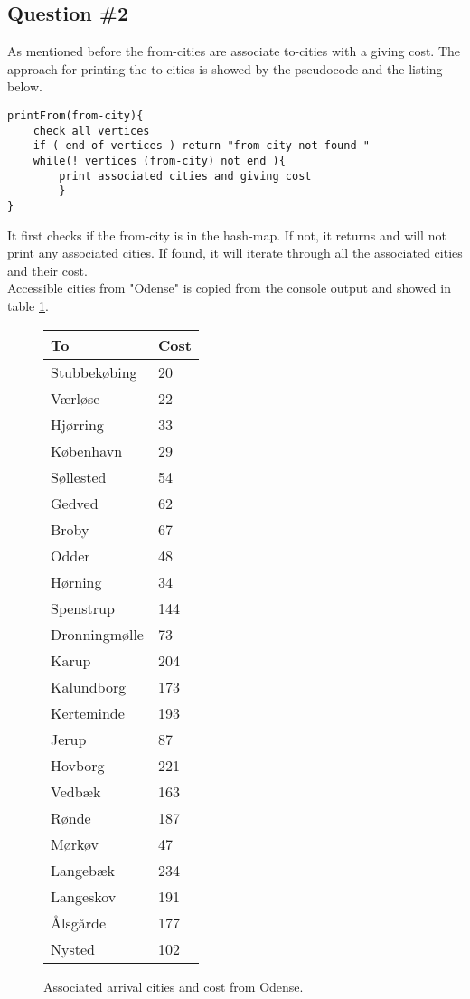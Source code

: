 \subsection{Question \#2}
As mentioned before the from-cities are associate to-cities with a giving cost. The approach for printing the to-cities is showed by the pseudocode and the listing below. 
\bigskip
\begin{lstlisting}
printFrom(from-city){
	check all vertices 
	if ( end of vertices ) return "from-city not found "
	while(! vertices (from-city) not end ){
	    print associated cities and giving cost
        }
}
\end{lstlisting}
\bigskip
It first checks if the from-city is in the hash-map. If not, it returns and will not print any associated cities. If found, it will iterate through all the associated cities and their cost.\\
Accessible cities from "Odense" is copied from the console output and showed in table \ref{tb:fromodense}. 
\begin{figure}[th!]
\centering
\begin{tabular}{l|l}
To &Cost\\\hline
Stubbekøbing & 20\\
Værløse & 22\\
Hjørring & 33\\
København & 29\\
Søllested & 54\\
Gedved & 62\\
Broby & 67\\
Odder & 48\\
Hørning & 34\\
Spenstrup & 144\\
Dronningmølle & 73\\
Karup & 204\\
Kalundborg & 173\\
Kerteminde & 193\\
Jerup & 87\\
Hovborg & 221\\
Vedbæk & 163\\
Rønde & 187\\
Mørkøv & 47\\
Langebæk & 234\\
Langeskov & 191\\
Ålsgårde & 177\\
Nysted & 102\\
\end{tabular}
\captionsetup{type=table}
\caption[tekst i indholdsfortegnelsen]{Associated arrival cities and cost from Odense.}
\label{tb:fromodense}
\end{figure}

